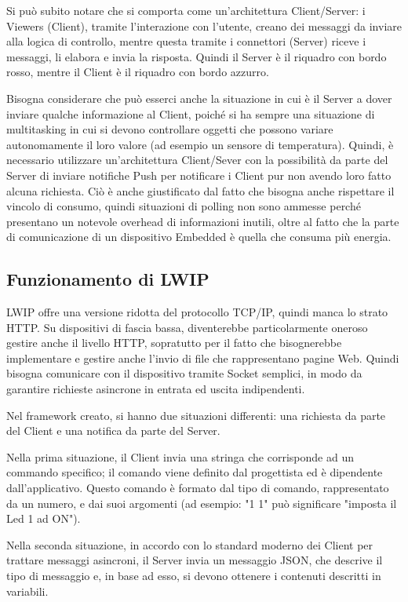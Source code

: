 \documentclass[journal]{IEEEtran}
\begin{document}
Si può subito notare che si comporta come un'architettura Client/Server: i Viewers (Client), tramite l'interazione con l'utente, creano dei messaggi da inviare alla logica di controllo, mentre questa tramite i connettori (Server) riceve i messaggi, li elabora e invia la risposta. Quindi il Server è il riquadro con bordo rosso, mentre il Client è il riquadro con bordo azzurro.

Bisogna considerare che può esserci anche la situazione in cui è il Server a dover inviare qualche informazione al Client, poiché si ha sempre una situazione di multitasking in cui si devono controllare oggetti che possono variare autonomamente il loro valore (ad esempio un sensore di temperatura). Quindi, è necessario utilizzare un'architettura Client/Sever con la possibilità da parte del Server di inviare notifiche Push per notificare i Client pur non avendo loro fatto alcuna richiesta. Ciò è anche giustificato dal fatto che bisogna anche rispettare il vincolo di consumo, quindi situazioni di polling non sono ammesse perché presentano un notevole overhead di informazioni inutili, oltre al fatto che la parte di comunicazione di un dispositivo Embedded è quella che consuma più energia.

\subsection{Funzionamento di LWIP}

LWIP offre una versione ridotta del protocollo TCP/IP, quindi manca lo strato HTTP. Su dispositivi di fascia bassa, diventerebbe particolarmente oneroso gestire anche il livello HTTP, sopratutto per il fatto che bisognerebbe implementare e gestire anche l'invio di file che rappresentano pagine Web. Quindi bisogna comunicare con il dispositivo tramite Socket semplici, in modo da garantire richieste asincrone in entrata ed uscita indipendenti.

Nel framework creato, si hanno due situazioni differenti: una richiesta da parte del Client e una notifica da parte del Server.

Nella prima situazione, il Client invia una stringa che corrisponde ad un commando specifico; il comando viene definito dal progettista ed è dipendente dall'applicativo. Questo comando è formato dal tipo di comando, rappresentato da un numero, e dai suoi argomenti (ad esempio: "1 1" può significare "imposta il Led 1 ad ON").

Nella seconda situazione, in accordo con lo standard moderno dei Client per trattare messaggi asincroni, il Server invia un messaggio JSON, che descrive il tipo di messaggio e, in base ad esso, si devono ottenere i contenuti descritti in variabili.
\end{document}
